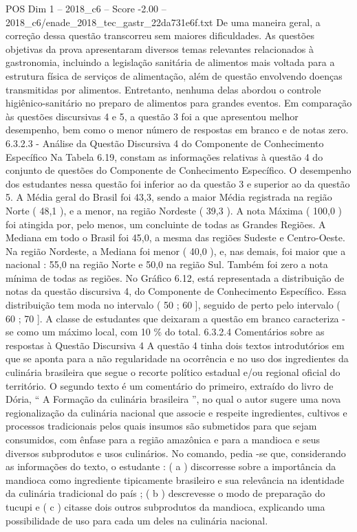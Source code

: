 \begin{textsample}{POS Dim 1 – 2018\_c6 – Score -2.00 – 2018\_c6/enade\_2018\_tec\_gastr\_22da731e6f.txt}
De uma maneira geral, a correção dessa questão transcorreu sem maiores dificuldades.
As questões objetivas da prova apresentaram diversos temas relevantes relacionados à gastronomia, incluindo a legislação sanitária de alimentos mais voltada para a estrutura física de serviços de alimentação, além de questão envolvendo doenças transmitidas por alimentos.
Entretanto, nenhuma delas abordou o controle higiênico-sanitário no preparo de alimentos para grandes eventos.
Em comparação às questões discursivas 4 e 5, a questão 3 foi a que apresentou melhor desempenho, bem como o menor número de respostas em branco e de notas zero. 6.3.2.3 - Análise da Questão Discursiva 4 do Componente de Conhecimento Específico Na Tabela 6.19, constam as informações relativas à questão 4 do conjunto de questões do Componente de Conhecimento Específico.
O desempenho dos estudantes nessa questão foi inferior ao da questão 3 e superior ao da questão 5.
A Média geral do Brasil foi 43,3, sendo a maior Média registrada na região Norte ( 48,1 ), e a menor, na região Nordeste ( 39,3 ).
A nota Máxima ( 100,0 ) foi atingida por, pelo menos, um concluinte de todas as Grandes Regiões.
A Mediana em todo o Brasil foi 45,0, a mesma das regiões Sudeste e Centro-Oeste.
Na região Nordeste, a Mediana foi menor ( 40,0 ), e, nas demais, foi maior que a nacional : 55,0 na região Norte e 50,0 na região Sul.
Também foi zero a nota mínima de todas as regiões.
No Gráfico 6.12, está representada a distribuição de notas da questão discursiva 4, do Componente de Conhecimento Específico.
Essa distribuição tem moda no intervalo ( 50 ; 60 ], seguido de perto pelo intervalo ( 60 ; 70 ].
A classe de estudantes que deixaram a questão em branco caracteriza -se como um máximo local, com 10 \% do total. 6.3.2.4 Comentários sobre as respostas à Questão Discursiva 4 A questão 4 tinha dois textos introdutórios em que se aponta para a não regularidade na ocorrência e no uso dos ingredientes da culinária brasileira que segue o recorte político estadual e/ou regional oficial do território.
O segundo texto é um comentário do primeiro, extraído do livro de Dória, “ A Formação da culinária brasileira ”, no qual o autor sugere uma nova regionalização da culinária nacional que associe e respeite ingredientes, cultivos e processos tradicionais pelos quais insumos são submetidos para que sejam consumidos, com ênfase para a região amazônica e para a mandioca e seus diversos subprodutos e usos culinários.
No comando, pedia -se que, considerando as informações do texto, o estudante : ( a ) discorresse sobre a importância da mandioca como ingrediente tipicamente brasileiro e sua relevância na identidade da culinária tradicional do país ; ( b ) descrevesse o modo de preparação do tucupi e ( c ) citasse dois outros subprodutos da mandioca, explicando uma possibilidade de uso para cada um deles na culinária nacional.

\end{textsample}
